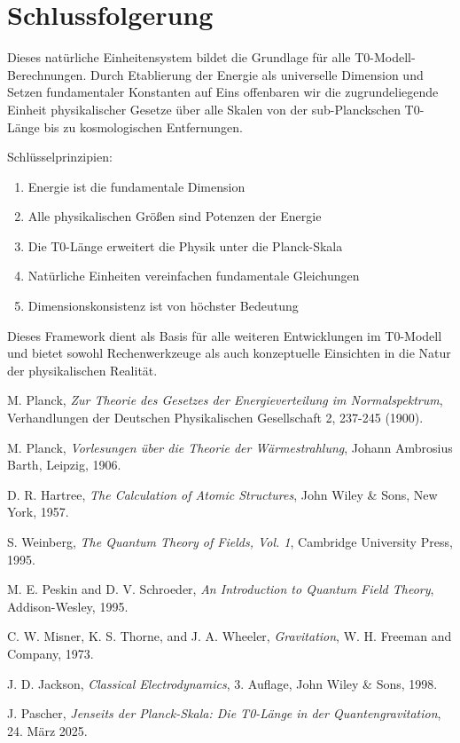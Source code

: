 \documentclass[11pt,a4paper]{article}
\begin{document}
	\section{Schlussfolgerung}
	
	Dieses natürliche Einheitensystem bildet die Grundlage für alle T0-Modell-Berechnungen. Durch Etablierung der Energie als universelle Dimension und Setzen fundamentaler Konstanten auf Eins offenbaren wir die zugrundeliegende Einheit physikalischer Gesetze über alle Skalen von der sub-Planckschen T0-Länge bis zu kosmologischen Entfernungen.
	
	Schlüsselprinzipien:
	\begin{enumerate}
		\item Energie ist die fundamentale Dimension
		\item Alle physikalischen Größen sind Potenzen der Energie
		\item Die T0-Länge erweitert die Physik unter die Planck-Skala
		\item Natürliche Einheiten vereinfachen fundamentale Gleichungen
		\item Dimensionskonsistenz ist von höchster Bedeutung
	\end{enumerate}
	
	Dieses Framework dient als Basis für alle weiteren Entwicklungen im T0-Modell und bietet sowohl Rechenwerkzeuge als auch konzeptuelle Einsichten in die Natur der physikalischen Realität.
	
	
	\begin{thebibliography}{10}
		
		M. Planck,
		\textit{Zur Theorie des Gesetzes der Energieverteilung im Normalspektrum},
		Verhandlungen der Deutschen Physikalischen Gesellschaft 2, 237-245 (1900).
		
		M. Planck,
		\textit{Vorlesungen über die Theorie der Wärmestrahlung},
		Johann Ambrosius Barth, Leipzig, 1906.
		
		D. R. Hartree,
		\textit{The Calculation of Atomic Structures},
		John Wiley \& Sons, New York, 1957.
		
		S. Weinberg,
		\textit{The Quantum Theory of Fields, Vol. 1},
		Cambridge University Press, 1995.
		
		M. E. Peskin and D. V. Schroeder,
		\textit{An Introduction to Quantum Field Theory},
		Addison-Wesley, 1995.
		
		C. W. Misner, K. S. Thorne, and J. A. Wheeler,
		\textit{Gravitation},
		W. H. Freeman and Company, 1973.
		
		J. D. Jackson,
		\textit{Classical Electrodynamics},
		3. Auflage, John Wiley \& Sons, 1998.
		
		J. Pascher,
		\textit{Jenseits der Planck-Skala: Die T0-Länge in der Quantengravitation},
		24. März 2025.
		
	\end{thebibliography}
	
	
\end{document}
